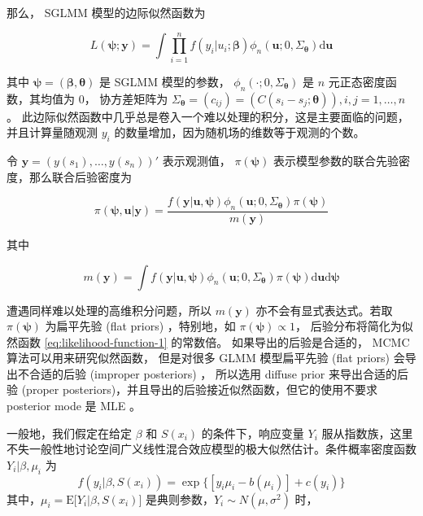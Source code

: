 \documentclass[12pt,a4paper,UTF8,twoside]{book}
\theoremstyle{definition}
\theoremstyle{definition}
\theoremstyle{definition}
\theoremstyle{remark}
\begin{document}
\noindent 那么， SGLMM 模型的边际似然函数为

\begin{equation}
L(\boldsymbol{\psi};\mathbf{y}) = \int \prod_{i=1}^{n} f(y_i|u_i;\boldsymbol{\beta})\phi_{n}(\mathbf{u};0,\Sigma_{\boldsymbol{\theta}})\mathrm{d}\mathbf{u} \label{eq:likelihood-function-1}
\end{equation}

\noindent 其中
\(\boldsymbol{\psi} = (\boldsymbol{\beta},\boldsymbol{\theta})\) 是
SGLMM 模型的参数， \(\phi_{n}(\cdot;0,\Sigma_{\boldsymbol{\theta}})\) 是
\(n\) 元正态密度函数，其均值为 0， 协方差矩阵为
\(\Sigma_{\boldsymbol{\theta}} = (c_{ij}) = (C(s_i - s_j; \boldsymbol{\theta})), i,j = 1,\ldots,n\)。
此边际似然函数中几乎总是卷入一个难以处理的积分，这是主要面临的问题，并且计算量随观测
\(y_i\) 的数量增加，因为随机场的维数等于观测的个数。

令 \(\mathbf{y} = (y(s_1),\ldots,y(s_n))'\) 表示观测值，
\(\pi(\boldsymbol{\psi})\)
表示模型参数的联合先验密度，那么联合后验密度为

\[
\pi(\boldsymbol{\psi},\mathbf{u}|\mathbf{y}) = \frac{f(\mathbf{y|\mathbf{u}, \boldsymbol{\psi}})\phi_{n}(\mathbf{u};0,\Sigma_{\boldsymbol{\theta}})\pi(\boldsymbol{\psi})}{m(\mathbf{y})}
\]

\noindent 其中

\[
m(\mathbf{y}) = \int f(\mathbf{y|\mathbf{u}, \boldsymbol{\psi}})\phi_{n}(\mathbf{u};0,\Sigma_{\boldsymbol{\theta}})\pi(\boldsymbol{\psi})\mathrm{d} \mathbf{u} \mathrm{d} \boldsymbol{\psi}
\]

\noindent 遭遇同样难以处理的高维积分问题，所以 \(m(\mathbf{y})\)
亦不会有显式表达式。若取 \(\pi(\boldsymbol{\psi})\) 为扁平先验 (flat
priors) ，特别地，如 \(\pi(\boldsymbol{\psi}) \propto 1\)，
后验分布将简化为似然函数 \eqref{eq:likelihood-function-1} 的常数倍。
如果导出的后验是合适的， MCMC 算法可以用来研究似然函数， 但是对很多 GLMM
模型扁平先验 (flat priors) 会导出不合适的后验 (improper posteriors)
\citep{Natarajan1995}， 所以选用 diffuse prior 来导出合适的后验 (proper
posteriors)，并且导出的后验接近似然函数，但它的使用不要求 posterior mode
是 MLE \citep{Robert1996JASA}。

一般地，我们假定在给定 \(\beta\) 和 \(S(x_i)\) 的条件下，响应变量
\(Y_i\)
服从指数族，这里不失一般性地讨论空间广义线性混合效应模型的极大似然估计。条件概率密度函数
\(Y_i|\beta,\mu_i\) 为
\[f(y_i|\beta,S(x_i))=\exp\{ [y_{i}\mu_i-b(\mu_i)] + c(y_i) \}\]
其中，\(\mu_i = \mathrm{E}\big[Y_i|\beta,S(x_i)\big]\)
是典则参数，\(Y_i \sim N(\mu,\sigma^2)\) 时，
\end{document}
